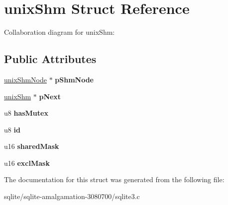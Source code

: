 \hypertarget{structunix_shm}{\section{unix\+Shm Struct Reference}
\label{structunix_shm}
}


Collaboration diagram for unix\+Shm\+:
\subsection*{Public Attributes}
\begin{DoxyCompactItemize}
\item 
\hypertarget{structunix_shm_a8ab421232d29e3237262ef46775199ee}{\hyperlink{structunix_shm_node}{unix\+Shm\+Node} $\ast$ {\bfseries p\+Shm\+Node}}\label{structunix_shm_a8ab421232d29e3237262ef46775199ee}

\item 
\hypertarget{structunix_shm_a0d5229cf734581f51cdf16dd7d5ce93a}{\hyperlink{structunix_shm}{unix\+Shm} $\ast$ {\bfseries p\+Next}}\label{structunix_shm_a0d5229cf734581f51cdf16dd7d5ce93a}

\item 
\hypertarget{structunix_shm_a43903be262472299c5eee917ba7c523c}{u8 {\bfseries has\+Mutex}}\label{structunix_shm_a43903be262472299c5eee917ba7c523c}

\item 
\hypertarget{structunix_shm_a88a5e7161ff31f85740dbfc0ba7ad38a}{u8 {\bfseries id}}\label{structunix_shm_a88a5e7161ff31f85740dbfc0ba7ad38a}

\item 
\hypertarget{structunix_shm_a768aa62a6ea2bd91ab60a34d7654811b}{u16 {\bfseries shared\+Mask}}\label{structunix_shm_a768aa62a6ea2bd91ab60a34d7654811b}

\item 
\hypertarget{structunix_shm_ac6f786d95952e51cab941cbfb9243c8e}{u16 {\bfseries excl\+Mask}}\label{structunix_shm_ac6f786d95952e51cab941cbfb9243c8e}

\end{DoxyCompactItemize}


The documentation for this struct was generated from the following file\+:\begin{DoxyCompactItemize}
\item 
sqlite/sqlite-\/amalgamation-\/3080700/sqlite3.\+c\end{DoxyCompactItemize}
